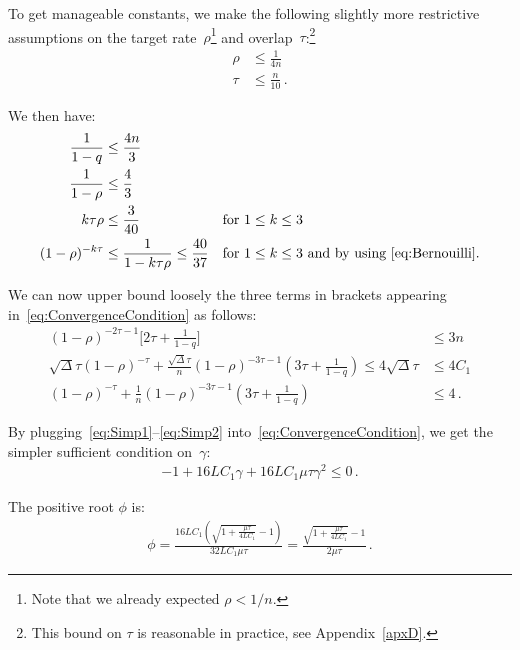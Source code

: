 \documentclass[twoside]{article}
\newcommand{\stepsize}{\gamma}
\newcommand{\strongconvex}{\mu}
\newcommand{\overlap}{\tau}
\newcommand{\contraction}{\rho}
\newcommand{\sparsity}{\Delta}
\newcommand{\lipschitz}{L}
\begin{document}
To get manageable constants, we make the following slightly more restrictive assumptions on the target rate~$\contraction$\footnote{Note that we already expected $\contraction < 1/n$.} and overlap~$\overlap$:\footnote{This bound on $\overlap$ is reasonable in practice, see Appendix~\ref{apxD}.}
\begin{align}
\contraction &\leq \frac{1}{4n} \label{eq:assumptionContraction}
\\
\overlap &\leq \frac{n}{10} \, . \label{eq:assumptionOverlap}
\end{align}

We then have:
\begin{align}
\frac{1}{1-q} &\leq \frac{4n}{3} & &
\\
\frac{1}{1-\contraction} &\leq \frac{4}{3} & &
\\
k\overlap\contraction &\leq \frac{3}{40} & &
\text{for $1 \leq k \leq 3$}
\\
(1 -\contraction)^{-k\overlap} &\leq \frac{1}{1-k\overlap \contraction} \leq \frac{40}{37} & &
\text{for $1 \leq k \leq 3$ and by using~\eqref{eq:Bernouilli}}.
\end{align}

We can now upper bound loosely the three terms in brackets appearing in~\eqref{eq:ConvergenceCondition} as follows:
\begin{align}
(1-\contraction)^{-2\overlap -1} \big[2\overlap + \frac{1}{1-q}\big] &\leq 3n \label{eq:Simp1}
\\
\sqrt{\sparsity}\overlap(1-\contraction)^{-\overlap} + \frac{\sqrt{\sparsity}\overlap}{n}(1 -\contraction)^{-3\overlap -1}(3\overlap + \frac{1}{1 -q}) 
\leq 4 \sqrt{\sparsity}\overlap &\leq 4C_1
\\
(1-\contraction)^{-\overlap} + \frac{1}{n}(1 -\contraction)^{-3\overlap -1}(3\overlap + \frac{1}{1 -q}) &\leq 4 \, .
\label{eq:Simp2}
\end{align}

By plugging~\eqref{eq:Simp1}--\eqref{eq:Simp2} into~\eqref{eq:ConvergenceCondition}, we get the simpler sufficient condition on~$\stepsize$:
\begin{align}
-1 + 16\lipschitz C_1 \stepsize + 16\lipschitz C_1\strongconvex\overlap\stepsize^2 \leq 0 \, .
\end{align}

The positive root $\phi$ is:
\begin{align}\label{eq:phi}
\phi = \frac{16\lipschitz C_1(\sqrt{1 + \frac{\strongconvex\overlap}{4\lipschitz C_1}} -1)}{32 \lipschitz C_1\strongconvex\overlap}
= \frac{\sqrt{1 + \frac{\strongconvex\overlap}{4\lipschitz C_1}} -1}{2\strongconvex\overlap}  \, .
\end{align}
\end{document}
